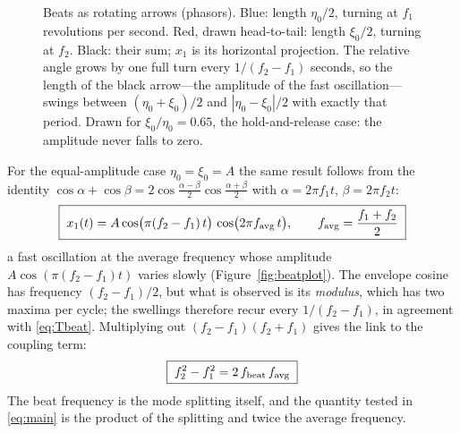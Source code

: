 \documentclass[11pt,a4paper]{article}
\begin{document}
\begin{figure}[htbp]
\centering
{}
\caption{Beats as rotating arrows (phasors). Blue: length $\eta_0/2$, turning at $f_1$ revolutions per second. Red, drawn head-to-tail: length $\xi_0/2$, turning at $f_2$. Black: their sum; $x_1$ is its horizontal projection. The relative angle grows by one full turn every $1/(f_2-f_1)$ seconds, so the length of the black arrow---the amplitude of the fast oscillation---swings between $(\eta_0+\xi_0)/2$ and $|\eta_0-\xi_0|/2$ with exactly that period. Drawn for $\xi_0/\eta_0=0.65$, the hold-and-release case: the amplitude never falls to zero.}
\label{fig:phasor}
\end{figure}

For the equal-amplitude case $\eta_0=\xi_0=A$ the same result follows from the identity $\cos\alpha+\cos\beta=2\cos\frac{\alpha-\beta}{2}\cos\frac{\alpha+\beta}{2}$ with $\alpha=2\pi f_1t$, $\beta=2\pi f_2t$:
\begin{equation}
\boxed{\;x_1(t)=A\cos\!\big(\pi(f_2-f_1)\,t\big)\,\cos\!\big(2\pi f_{\rm avg}\,t\big),\qquad f_{\rm avg}=\frac{f_1+f_2}{2}\;}
\label{eq:beats}
\end{equation}
a fast oscillation at the average frequency whose amplitude $A\cos(\pi(f_2-f_1)t)$ varies slowly (Figure~\ref{fig:beatplot}). The envelope cosine has frequency $(f_2-f_1)/2$, but what is observed is its \emph{modulus}, which has two maxima per cycle; the swellings therefore recur every $1/(f_2-f_1)$, in agreement with \eqref{eq:Tbeat}. Multiplying out $(f_2-f_1)(f_2+f_1)$ gives the link to the coupling term:
\begin{equation}
\boxed{\;f_2^2-f_1^2=2\,f_{\rm beat}\,f_{\rm avg}\;}
\label{eq:beats_identity}
\end{equation}
The beat frequency is the mode splitting itself, and the quantity tested in \eqref{eq:main} is the product of the splitting and twice the average frequency.
\end{document}
